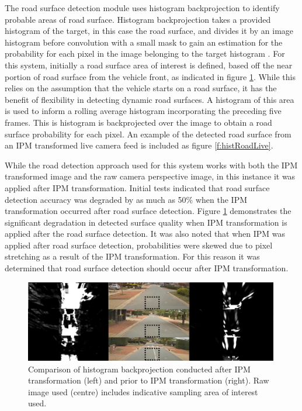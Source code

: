 \documentclass[]{aiaa-tc}%
\begin{document}
The road surface detection module uses histogram backprojection to identify probable areas of road surface. Histogram backprojection takes a provided histogram of the target, in this case the road surface, and divides it by an image histogram before convolution with a small mask to gain an estimation for the probability for each pixel in the image belonging to the target histogram \citep{histBackImageIndexing}. For this system, initially a road surface area of interest is defined, based off the near portion of road surface from the vehicle front, as indicated in figure \ref{f:histIPMcompare}. While this relies on the assumption that the vehicle starts on a road surface, it has the benefit of flexibility in detecting dynamic road surfaces. A histogram of this area is used to inform a rolling average histogram incorporating the preceding five frames. This is histogram is backprojected over the image to obtain a road surface probability for each pixel. An example of the detected road surface from an IPM transformed live camera feed is included as figure \ref{f:histRoadLive}. 

While the road detection approach used for this system works with both the IPM transformed image and the raw camera perspective image, in this instance it was applied after IPM transformation. Initial tests indicated that road surface detection accuracy was degraded by as much as 50\% when the IPM transformation occurred after road surface detection. Figure \ref{f:histIPMcompare} demonstrates the significant degradation in detected surface quality when IPM transformation is applied after the road surface detection. It was also noted that when IPM was applied after road surface detection, probabilities were skewed due to pixel stretching as a result of the IPM transformation. For this reason it was determined that road surface detection should occur after IPM transformation.

\begin{figure}
	\includegraphics[width=0.99\textwidth]{RoadDetection/histIPMcompare.png}
	\caption{Comparison of histogram backprojection conducted after IPM transformation (left) and prior to IPM transformation (right). Raw image used (centre) includes indicative sampling area of interest used.}
	\label{f:histIPMcompare}
\end{figure}
\end{document}
